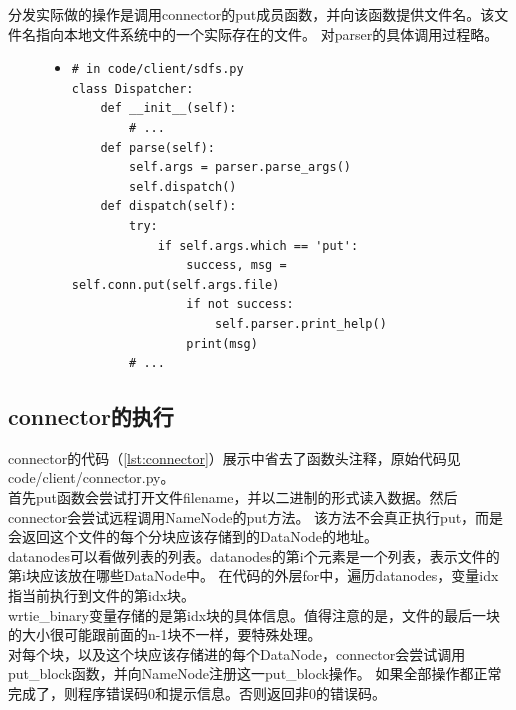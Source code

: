 \documentclass[a4paper]{article}
\begin{document}
分发实际做的操作是调用connector的put成员函数，并向该函数提供文件名。该文件名指向本地文件系统中的一个实际存在的文件。
对parser的具体调用过程略。
\begin{figure}[!hbt]
\begin{itemize}
\item[] \begin{lstlisting}[style=mypython, label=lst:put-frontend, caption=put命令的解析和分发]
# in code/client/sdfs.py
class Dispatcher:
    def __init__(self):
        # ...
    def parse(self):
        self.args = parser.parse_args()
        self.dispatch()
    def dispatch(self):
        try:
            if self.args.which == 'put':
                success, msg = self.conn.put(self.args.file)
                if not success:
                    self.parser.print_help()
                print(msg)
        # ...
\end{lstlisting}
\end{itemize}
\end{figure}

\subsection{connector的执行}
connector的代码（\autoref{lst:connector}）展示中省去了函数头注释，原始代码见code/client/connector.py。\\

首先put函数会尝试打开文件filename，并以二进制的形式读入数据。然后connector会尝试远程调用NameNode的put方法。
该方法不会真正执行put，而是会返回这个文件的每个分块应该存储到的DataNode的地址。\\

datanodes可以看做列表的列表。datanodes的第i个元素是一个列表，表示文件的第i块应该放在哪些DataNode中。
在代码的外层for中，遍历datanodes，变量idx指当前执行到文件的第idx块。\\

wrtie\_binary变量存储的是第idx块的具体信息。值得注意的是，文件的最后一块的大小很可能跟前面的n-1块不一样，要特殊处理。\\

对每个块，以及这个块应该存储进的每个DataNode，connector会尝试调用put\_block函数，并向NameNode注册这一put\_block操作。
如果全部操作都正常完成了，则程序错误码0和提示信息。否则返回非0的错误码。
\end{document}
